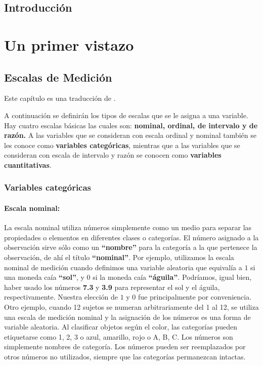 \documentclass[
  a4paper,
  oneside,
  openany]{book}
\begin{document}
\hypertarget{introducciuxf3n}{%
\chapter*{Introducción}\label{introducciuxf3n}}


\hypertarget{part-un-primer-vistazo}{%
\part{Un primer vistazo}\label{part-un-primer-vistazo}}

\hypertarget{escalas-de-mediciuxf3n}{%
\chapter{Escalas de Medición}\label{escalas-de-mediciuxf3n}}

Este capítulo es una traducción de \citet{conover1998practical}.

A continuación se definirán los tipos de escalas que se le asigna a una variable. Hay cuatro escalas básicas las cuales son: \textbf{nominal, ordinal, de intervalo y de razón.} A las variables que se consideran con escala ordinal y nominal también se les conoce como \textbf{variables categóricas}, mientras que a las variables que se consideran con escala de intervalo y razón se conocen como \textbf{variables cuantitativas}.

\hypertarget{variables-categuxf3ricas}{%
\section{Variables categóricas}\label{variables-categuxf3ricas}}

\hypertarget{escala-nominal}{%
\subsection{Escala nominal:}\label{escala-nominal}}

La escala nominal utiliza números simplemente como un medio para separar las propiedades o elementos en diferentes clases o categorías. El número asignado a la observación sirve sólo como un \textbf{``nombre''} para la categoría a la que pertenece la observación, de ahí el título \textbf{``nominal''}. Por ejemplo, utilizamos la escala nominal de medición cuando definimos una variable aleatoria que equivalía a \(1\) si una moneda caía \textbf{``sol''}, y \(0\) si la moneda caía \textbf{``águila''}. Podríamos, igual bien, haber usado los números \textbf{7.3} y \textbf{3.9} para representar el sol y el águila, respectivamente. Nuestra elección de \(1\) y \(0\) fue principalmente por conveniencia.
Otro ejemplo, cuando 12 sujetos se numeran arbitrariamente del 1 al 12, se utiliza una escala de medición nominal y la asignación de los números es una forma de variable aleatoria. Al clasificar objetos según el color, las categorías pueden etiquetarse como 1, 2, 3 o azul, amarillo, rojo o A, B, C. Los números son simplemente nombres de categoría. Los números pueden ser reemplazados por otros números no utilizados, siempre que las categorías permanezcan intactas.
\end{document}
